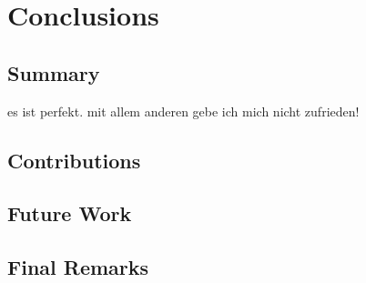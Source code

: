 \chapter{Conclusions}
\label{ch:closure}

\section{Summary}
es ist perfekt. mit allem anderen gebe ich mich nicht zufrieden!

\section{Contributions}

\section{Future Work}

\section{Final Remarks}
